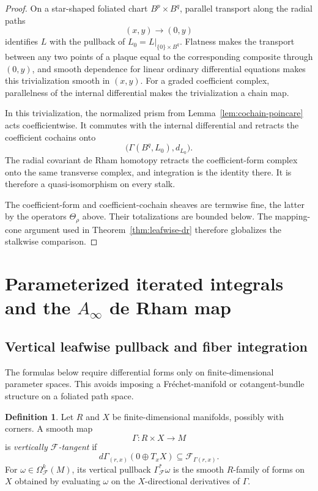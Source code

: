 \documentclass[12pt]{amsart}
\theoremstyle{definition}
\newtheorem{defn}[thm]{Definition}
\theoremstyle{remark}
\numberwithin{equation}{section}
\newcommand{\CF}{{\mathcal F}}
\newcommand{\1}{{\mathbb{1}}}
\begin{document}
\begin{proof}
On a star-shaped foliated chart $B^p\times B^q$, parallel transport
along the radial paths
\[
 (x,y)\longrightarrow(0,y)
\]
identifies $L$ with the pullback of
$L_0=L|_{\{0\}\times B^q}$.  Flatness makes the transport between any
two points of a plaque equal to the corresponding composite through
$(0,y)$, and smooth dependence for linear ordinary differential
equations makes this trivialization smooth in $(x,y)$.  For a graded
coefficient complex, parallelness of the internal differential makes
the trivialization a chain map.

In this trivialization, the normalized prism from
Lemma~\ref{lem:cochain-poincare} acts coefficientwise.  It commutes
with the internal differential and retracts the coefficient cochains
onto
\[
 \bigl(\Gamma(B^q,L_0),d_{L_0}\bigr).
\]
The radial covariant de Rham homotopy retracts the coefficient-form
complex onto the same transverse complex, and integration is the
identity there.  It is therefore a quasi-isomorphism on every stalk.

The coefficient-form and coefficient-cochain sheaves are termwise
fine, the latter by the operators $\Theta_\rho$ above.  Their
totalizations are bounded below.  The mapping-cone argument used in
Theorem~\ref{thm:leafwise-dr} therefore globalizes the stalkwise
comparison.
\end{proof}

\section{Parameterized iterated integrals and the
$A_{\infty}$ de Rham map}

\subsection{Vertical leafwise pullback and fiber integration}

The formulas below require differential forms only on finite-dimensional
parameter spaces.  This avoids imposing a Fr\'echet-manifold or
cotangent-bundle structure on a foliated path space.

\begin{defn}\label{def:vertical-pullback}
Let $R$ and $X$ be finite-dimensional manifolds, possibly with corners.
A smooth map
\[
 \Gamma:R\times X\longrightarrow M
\]
is \emph{vertically $\CF$-tangent} if
\[
 d\Gamma_{(r,x)}(0\oplus T_xX)
 \subseteq\CF_{\Gamma(r,x)}.
\]
For $\omega\in\Omega^k_{\CF}(M)$, its vertical pullback
$\Gamma_{\CF}^*\omega$ is the smooth $R$-family of forms on $X$
obtained by evaluating $\omega$ on the $X$-directional derivatives of
$\Gamma$.
\end{defn}
\end{document}
